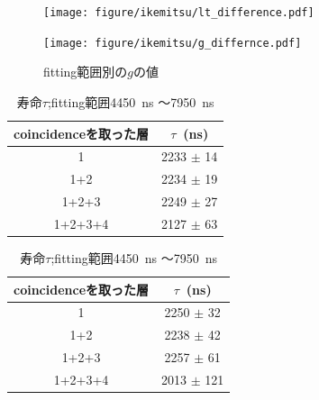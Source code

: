   \begin{figure}[H]
   \centering
   \begin{minipage}{0.4\columnwidth}
    \centering
    \texttt{[image: figure/ikemitsu/lt\_difference.pdf]}
    \caption{fitting範囲別の寿命の値}
    \label{lt_diff}
   \end{minipage}
   \begin{minipage}{0.4\columnwidth}
    \centering
    \texttt{[image: figure/ikemitsu/g\_differnce.pdf]}
    \caption{fitting範囲別の$g$の値}
    \label{g_diff}
   \end{minipage}
  \end{figure}
  
  \begin{table}[H]
   \centering
   \begin{minipage}{0.4\columnwidth}
    \caption{寿命$\tau$;fitting範囲1050~ns 〜4550~ns }
    \label{fitrange1}
    \begin{center}
     \begin{tabular}{cc}\toprule
      coincidenceを取った層 & $\tau$~(ns) \\ \midrule
      1 			   & 2233 $\pm$ 14 \\
      1+2 		   & 2234 $\pm$ 19 \\
      1+2+3 		   & 2249 $\pm$ 27 \\
      1+2+3+4 	           & 2127 $\pm$ 63 \\ \bottomrule
     \end{tabular}
    \end{center}
   \end{minipage}
   \hspace*{5mm}
   \begin{minipage}{0.4\columnwidth}
    \caption{寿命$\tau$;fitting範囲4450~ns 〜7950~ns }
    \label{fitrange2}
    \begin{center}
     \begin{tabular}{cc}\toprule
      coincidenceを取った層 & $\tau$~(ns) \\ \midrule
      1 			   & 2250 $\pm$ 32 \\
      1+2 		   & 2238 $\pm$ 42 \\
      1+2+3 		   & 2257 $\pm$ 61 \\
      1+2+3+4 		   & 2013 $\pm$ 121 \\ \bottomrule
     \end{tabular}
    \end{center}   
   \end{minipage}
  \end{table}%

